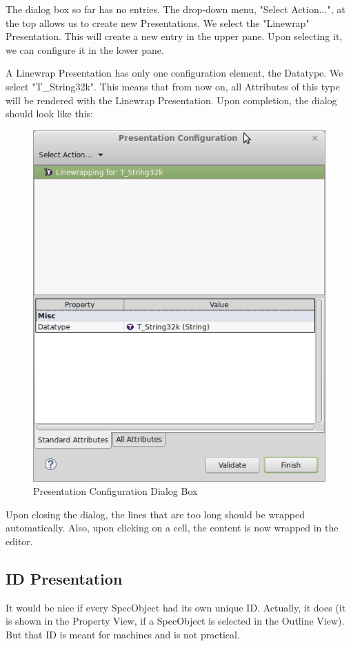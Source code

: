 The dialog box so far has no entries.  The drop-down menu, "Select Action...", at the top allows us to create new Presentations.  We select the "Linewrap" Presentation.  This will create a new entry in the upper pane.  Upon selecting it, we can configure it in the lower pane.

A Linewrap Presentation has only one configuration element, the Datatype.  We select "T\_String32k".  This means that from now on, all Attributes of this type will be rendered with the Linewrap Presentation.  Upon completion, the dialog should look like this:

\begin{figure}[h!]
\centering
\includegraphics[width=0.8\linewidth]{../rmf-images/presentationconfig.png}      
\caption{Presentation Configuration Dialog Box}      
\label{fig:presentationConfig}
\end{figure}

Upon closing the dialog, the lines that are too long should be wrapped automatically.  Also, upon clicking on a cell, the content is now wrapped in the editor.

\subsection{ID Presentation}

It would be nice if every SpecObject had its own unique ID.  Actually, it does (it is shown in the Property View, if a SpecObject is selected in
the Outline View).  But that ID is meant for machines and is not practical.

